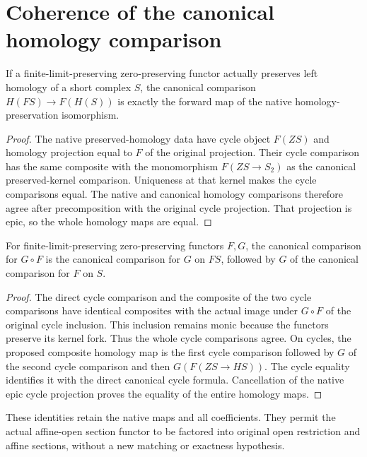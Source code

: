\section{Coherence of the canonical homology comparison}
\label{sec:left-exact-homology-coherence}

\begin{lemma}
\label{lem:left-exact-original-homology-preservation-agreement}
\leanok
{}
If a finite-limit-preserving zero-preserving functor actually
preserves left homology of a short complex $S$, the canonical
comparison $H(FS)\to F(H(S))$ is exactly the forward map of
the native homology-preservation isomorphism.
\end{lemma}
\begin{proof}
The native preserved-homology data have cycle object $F(ZS)$
and homology projection equal to $F$ of the original
projection. Their cycle comparison has the same composite
with the monomorphism $F(ZS\to S_2)$ as the canonical
preserved-kernel comparison. Uniqueness at that kernel makes
the cycle comparisons equal. The native and canonical
homology comparisons therefore agree after precomposition
with the original cycle projection. That projection is epic,
so the whole homology maps are equal.
\end{proof}

\begin{lemma}
\label{lem:left-exact-original-homology-composition}
\leanok
{}
For finite-limit-preserving zero-preserving functors $F,G$,
the canonical comparison for $G\circ F$ is the canonical
comparison for $G$ on $FS$, followed by $G$ of the canonical
comparison for $F$ on $S$.
\end{lemma}
\begin{proof}
The direct cycle comparison and the composite of the two
cycle comparisons have identical composites with the actual
image under $G\circ F$ of the original cycle inclusion. This
inclusion remains monic because the functors preserve its
kernel fork. Thus the whole cycle comparisons agree. On
cycles, the proposed composite homology map is the first
cycle comparison followed by $G$ of the second cycle
comparison and then $G(F(ZS\to HS))$. The cycle equality
identifies it with the direct canonical cycle formula.
Cancellation of the native epic cycle projection proves
the equality of the entire homology maps.
\end{proof}

These identities retain the native maps and all coefficients.
They permit the actual affine-open section functor to be
factored into original open restriction and affine sections,
without a new matching or exactness hypothesis.

